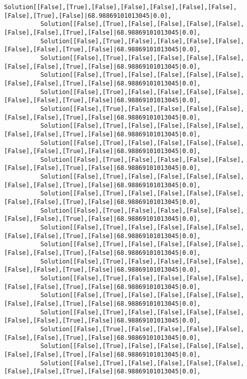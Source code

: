 \documentclass[11pt]{article}
\begin{document}
\begin{Verbatim}[commandchars=\\\{\}]
          Solution[[False],[True],[False],[False],[False],[False],[False],[False],[True],[False]|68.98869101013045|0.0],
          Solution[[False],[True],[False],[False],[False],[False],[False],[False],[True],[False]|68.98869101013045|0.0],
          Solution[[False],[True],[False],[False],[False],[False],[False],[False],[True],[False]|68.98869101013045|0.0],
          Solution[[False],[True],[False],[False],[False],[False],[False],[False],[True],[False]|68.98869101013045|0.0],
          Solution[[False],[True],[False],[False],[False],[False],[False],[False],[True],[False]|68.98869101013045|0.0],
          Solution[[False],[True],[False],[False],[False],[False],[False],[False],[True],[False]|68.98869101013045|0.0],
          Solution[[False],[True],[False],[False],[False],[False],[False],[False],[True],[False]|68.98869101013045|0.0],
          Solution[[False],[True],[False],[False],[False],[False],[False],[False],[True],[False]|68.98869101013045|0.0],
          Solution[[False],[True],[False],[False],[False],[False],[False],[False],[True],[False]|68.98869101013045|0.0],
          Solution[[False],[True],[False],[False],[False],[False],[False],[False],[True],[False]|68.98869101013045|0.0],
          Solution[[False],[True],[False],[False],[False],[False],[False],[False],[True],[False]|68.98869101013045|0.0],
          Solution[[False],[True],[False],[False],[False],[False],[False],[False],[True],[False]|68.98869101013045|0.0],
          Solution[[False],[True],[False],[False],[False],[False],[False],[False],[True],[False]|68.98869101013045|0.0],
          Solution[[False],[True],[False],[False],[False],[False],[False],[False],[True],[False]|68.98869101013045|0.0],
          Solution[[False],[True],[False],[False],[False],[False],[False],[False],[True],[False]|68.98869101013045|0.0],
          Solution[[False],[True],[False],[False],[False],[False],[False],[False],[True],[False]|68.98869101013045|0.0],
          Solution[[False],[True],[False],[False],[False],[False],[False],[False],[True],[False]|68.98869101013045|0.0],
          Solution[[False],[True],[False],[False],[False],[False],[False],[False],[True],[False]|68.98869101013045|0.0],
          Solution[[False],[True],[False],[False],[False],[False],[False],[False],[True],[False]|68.98869101013045|0.0],
          Solution[[False],[True],[False],[False],[False],[False],[False],[False],[True],[False]|68.98869101013045|0.0],
          Solution[[False],[True],[False],[False],[False],[False],[False],[False],[True],[False]|68.98869101013045|0.0],
          Solution[[False],[True],[False],[False],[False],[False],[False],[False],[True],[False]|68.98869101013045|0.0],

\end{Verbatim}
\end{document}
